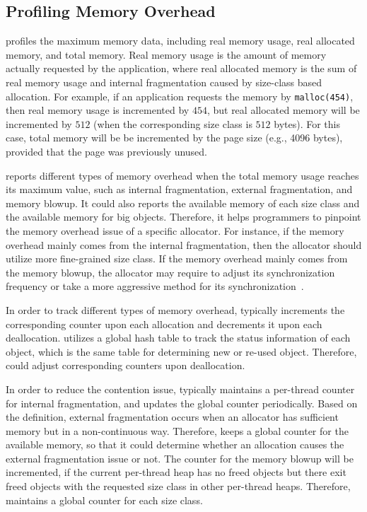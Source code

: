 \subsection{Profiling Memory Overhead}
\MP{} profiles the maximum memory data, including real memory usage, real allocated memory, and total memory. Real memory usage is the amount of memory actually requested  by the application, where real allocated memory is the sum of real memory usage and internal fragmentation caused by size-class based allocation. For example, if an application requests the memory by \texttt{malloc(454)}, then real memory usage is incremented by $454$, but real allocated memory will be incremented by $512$ (when the corresponding size class is $512$ bytes). For this case, total memory will be  be incremented by the page size (e.g., 4096 bytes), provided that the page was previously unused. 

\MP{} reports different types of memory overhead when the total memory usage reaches its maximum value, such as internal fragmentation, external fragmentation, and memory blowup. It could also reports the available memory of each size class and the available memory for big objects.  Therefore, it helps programmers to pinpoint the memory overhead issue of a specific allocator. For instance, if the memory overhead mainly comes from the internal fragmentation, then the allocator should utilize more fine-grained size class. If the memory overhead mainly comes from the memory blowup, the allocator may require to adjust its synchronization frequency or take a more aggressive method for its synchronization~\cite{DBLP:conf/iwmm/LiLD19}. 

In order to track different types of memory overhead, \MP{} typically increments the corresponding counter upon each allocation and decrements it upon each deallocation. \MP{} utilizes a global hash table to track the status information of each object, which is the same table for determining new or re-used object. Therefore, \MP{} could adjust corresponding counters upon deallocation. 

 In order to reduce the contention issue, \MP{} typically maintains a per-thread counter for internal fragmentation, and updates the global counter periodically.  Based on the definition, external fragmentation occurs when an allocator has sufficient memory but in a non-continuous way. Therefore, \MP{} keeps a global counter for the available memory, so that it could determine whether an allocation causes the external fragmentation issue or not.  The counter for the memory blowup will be incremented, if the current per-thread heap has no freed objects but there exit freed objects with the requested size class in other per-thread heaps. Therefore, \MP{} maintains a global counter for each size class. 

